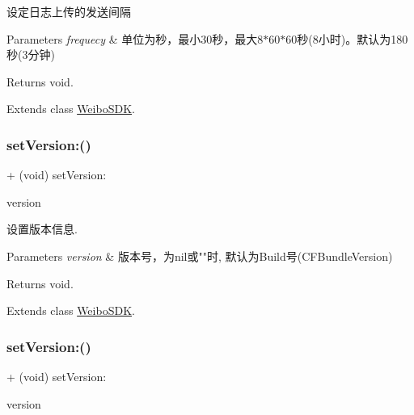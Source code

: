 设定日志上传的发送间隔 
\begin{DoxyParams}{Parameters}
{\em frequecy} & 单位为秒，最小30秒，最大8$\ast$60$\ast$60秒(8小时)。默认为180秒(3分钟) \\
\hline
\end{DoxyParams}
\begin{DoxyReturn}{Returns}
void. 
\end{DoxyReturn}


Extends class \mbox{\hyperlink{interface_weibo_s_d_k_a6790cf45454697f2b846eb080a130ef2}{Weibo\+S\+DK}}.

\mbox{\label{category_weibo_s_d_k_07_statistics_08_ac68e6c65a10fa6c5f04c1293050a7127}} 
\subsubsection{\texorpdfstring{set\+Version\+:()}{setVersion:()}\hspace{0.1cm}{\footnotesize\ttfamily [1/3]}}
{\footnotesize\ttfamily + (void) set\+Version\+: \begin{DoxyParamCaption}\item[{(N\+S\+String $\ast$)}]{version }\end{DoxyParamCaption}}

设置版本信息. 
\begin{DoxyParams}{Parameters}
{\em version} & 版本号，为nil或""时, 默认为\+Build号(\+C\+F\+Bundle\+Version) \\
\hline
\end{DoxyParams}
\begin{DoxyReturn}{Returns}
void. 
\end{DoxyReturn}


Extends class \mbox{\hyperlink{interface_weibo_s_d_k_ac68e6c65a10fa6c5f04c1293050a7127}{Weibo\+S\+DK}}.

\mbox{\label{category_weibo_s_d_k_07_statistics_08_ac68e6c65a10fa6c5f04c1293050a7127}} 
\subsubsection{\texorpdfstring{set\+Version\+:()}{setVersion:()}\hspace{0.1cm}{\footnotesize\ttfamily [2/3]}}
{\footnotesize\ttfamily + (void) set\+Version\+: \begin{DoxyParamCaption}\item[{(N\+S\+String $\ast$)}]{version }\end{DoxyParamCaption}}

